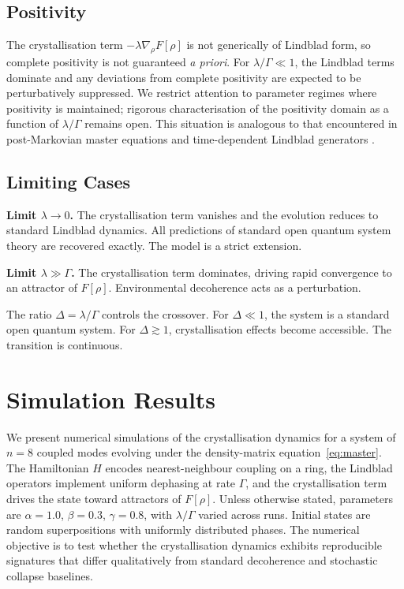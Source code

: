 \documentclass[12pt]{article}
\begin{document}
\subsection{Positivity}

The crystallisation term $-\lambda \nabla_\rho F[\rho]$ is not generically of Lindblad form, so complete positivity is not guaranteed \textit{a priori}. For $\lambda/\Gamma \ll 1$, the Lindblad terms dominate and any deviations from complete positivity are expected to be perturbatively suppressed. We restrict attention to parameter regimes where positivity is maintained; rigorous characterisation of the positivity domain as a function of $\lambda/\Gamma$ remains open. This situation is analogous to that encountered in post-Markovian master equations and time-dependent Lindblad generators \citep{Schlosshauer2007}.

\subsection{Limiting Cases}

\textbf{Limit $\lambda \to 0$.} The crystallisation term vanishes and the evolution reduces to standard Lindblad dynamics. All predictions of standard open quantum system theory are recovered exactly. The model is a strict extension.

\textbf{Limit $\lambda \gg \Gamma$.} The crystallisation term dominates, driving rapid convergence to an attractor of $F[\rho]$. Environmental decoherence acts as a perturbation.

The ratio $\Delta = \lambda/\Gamma$ controls the crossover. For $\Delta \ll 1$, the system is a standard open quantum system. For $\Delta \gtrsim 1$, crystallisation effects become accessible. The transition is continuous.

\section{Simulation Results}

We present numerical simulations of the crystallisation dynamics for a system of $n = 8$ coupled modes evolving under the density-matrix equation~\eqref{eq:master}. The Hamiltonian $H$ encodes nearest-neighbour coupling on a ring, the Lindblad operators implement uniform dephasing at rate $\Gamma$, and the crystallisation term drives the state toward attractors of $F[\rho]$. Unless otherwise stated, parameters are $\alpha = 1.0$, $\beta = 0.3$, $\gamma = 0.8$, with $\lambda/\Gamma$ varied across runs. Initial states are random superpositions with uniformly distributed phases. The numerical objective is to test whether the crystallisation dynamics exhibits reproducible signatures that differ qualitatively from standard decoherence and stochastic collapse baselines.
\end{document}
